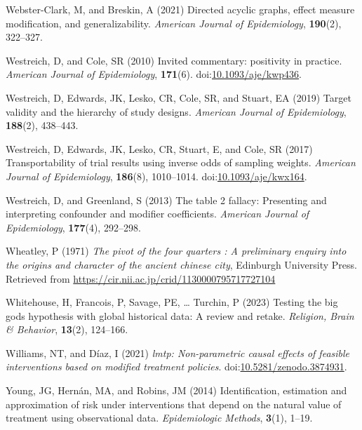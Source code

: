 \documentclass[
  single column]{article}
\newlength{\cslhangindent}
\newenvironment{CSLReferences}[2] %
 {\begin{list}{}{%
  \setlength{\itemindent}{0pt}
  \setlength{\leftmargin}{0pt}
  \setlength{\parsep}{0pt}
  \ifodd #1
   \setlength{\leftmargin}{\cslhangindent}
   \setlength{\itemindent}{-1\cslhangindent}
  \fi
  \setlength{\itemsep}{#2\baselineskip}}}
 {\end{list}}
\begin{document}
\begin{CSLReferences}{1}{0}
Webster-Clark, M, and Breskin, A (2021) Directed acyclic graphs, effect
measure modification, and generalizability. \emph{American Journal of
Epidemiology}, \textbf{190}(2), 322--327.

Westreich, D, and Cole, SR (2010) Invited commentary: positivity in
practice. \emph{American Journal of Epidemiology}, \textbf{171}(6).
doi:\href{https://doi.org/10.1093/aje/kwp436}{10.1093/aje/kwp436}.

Westreich, D, Edwards, JK, Lesko, CR, Cole, SR, and Stuart, EA (2019)
Target validity and the hierarchy of study designs. \emph{American
Journal of Epidemiology}, \textbf{188}(2), 438--443.

Westreich, D, Edwards, JK, Lesko, CR, Stuart, E, and Cole, SR (2017)
Transportability of trial results using inverse odds of sampling
weights. \emph{American Journal of Epidemiology}, \textbf{186}(8),
1010--1014.
doi:\href{https://doi.org/10.1093/aje/kwx164}{10.1093/aje/kwx164}.

Westreich, D, and Greenland, S (2013) The table 2 fallacy: Presenting
and interpreting confounder and modifier coefficients. \emph{American
Journal of Epidemiology}, \textbf{177}(4), 292--298.

Wheatley, P (1971) \emph{The pivot of the four quarters : A preliminary
enquiry into the origins and character of the ancient chinese city},
Edinburgh University Press. Retrieved from
\url{https://cir.nii.ac.jp/crid/1130000795717727104}

Whitehouse, H, Francois, P, Savage, PE, \ldots{} Turchin, P (2023)
Testing the big gods hypothesis with global historical data: A review
and retake. \emph{Religion, Brain \& Behavior}, \textbf{13}(2),
124--166.

Williams, NT, and Díaz, I (2021) \emph{{l}mtp: Non-parametric causal
effects of feasible interventions based on modified treatment policies}.
doi:\href{https://doi.org/10.5281/zenodo.3874931}{10.5281/zenodo.3874931}.

Young, JG, Hernán, MA, and Robins, JM (2014) Identification, estimation
and approximation of risk under interventions that depend on the natural
value of treatment using observational data. \emph{Epidemiologic
Methods}, \textbf{3}(1), 1--19.

\end{CSLReferences}
\end{document}
